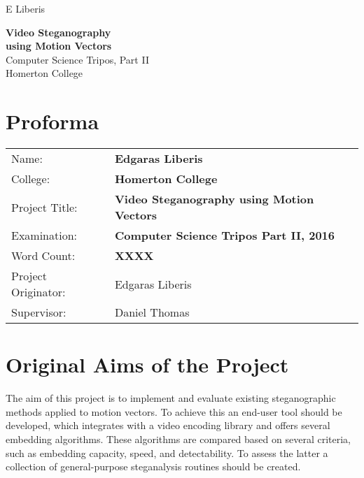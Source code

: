\documentclass[12pt,british,twoside,notitlepage,usenames,dvipsnames,hypens,final]{report}
\numberwithin{equation}{section}
\numberwithin{figure}{section}
\begin{document}
\pagestyle{empty}

\hfill{\LARGE E Liberis}

\vspace*{60mm}
\begin{center}
\Huge
{\bf Video Steganography \\ using Motion Vectors} \\
\vspace*{10mm}
{ \sc \LARGE
Computer Science Tripos, Part II \\
Homerton College \\
}
\vspace*{10mm}
\the\year 
\end{center}

\cleardoublepage

\setcounter{page}{1}
\pagestyle{plain}

{\section*{\Huge Proforma}}

{\large
\begin{tabular}{ll}
Name:               & \bf Edgaras Liberis                          \\
College:            & \bf Homerton College                         \\
Project Title:      & \bf Video Steganography using Motion Vectors \\
Examination:        & \bf Computer Science Tripos Part II, 2016    \\
Word Count:         & \bf XXXX\footnotemark[1]                     \\
Project Originator: & Edgaras Liberis                              \\
Supervisor:         & Daniel Thomas                                \\ 
\end{tabular}
}
\vspace{0.5cm}

\section*{Original Aims of the Project}

The aim of this project is to implement and evaluate existing steganographic methods  applied to motion vectors. To achieve this an end-user tool should be developed, which integrates with a video encoding library and offers several embedding algorithms. These algorithms are compared based on several criteria, such as embedding capacity, speed, and detectability. To assess the latter a collection of general-purpose steganalysis routines should be created.   
\end{document}
